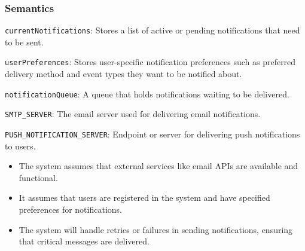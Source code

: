 \documentclass[12pt, titlepage]{article}
\begin{document}
\begin{description}
\subsubsection{Semantics}
\begin{description}
  \item[State Variables:]
  \item \texttt{currentNotifications}: Stores a list of active or pending notifications that need 
  to be sent.
  \item \texttt{userPreferences}: Stores user-specific notification preferences such as preferred 
  delivery method and event types they want to be notified about.
  \item \texttt{notificationQueue}: A queue that holds notifications waiting to be delivered.
  \item
  \item[Environment Variables:] 
  \item \texttt{SMTP\_SERVER}: The email server used for delivering email notifications.
  \item \texttt{PUSH\_NOTIFICATION\_SERVER}: Endpoint or server for delivering push notifications
  to users.
  \item
  \item[Assumptions:] 
  \item
  \begin{itemize}
    \item The system assumes that external services like email APIs are available and functional.
  \end{itemize}
  \item 
  \begin{itemize}
    \item It assumes that users are registered in the system and have specified preferences for 
    notifications.
  \end{itemize}
  \item 
  \begin{itemize}
    \item The system will handle retries or failures in sending notifications, ensuring that critical 
    messages are delivered.
  \end{itemize}
  \item 


\end{description}
\end{description}
\end{document}
